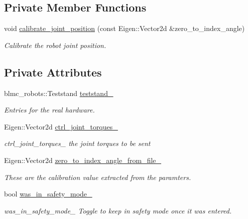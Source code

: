 \subsection*{Private Member Functions}
\begin{DoxyCompactItemize}
\item 
void \hyperlink{classdg__blmc__robots_1_1DGMTeststand_a0bce1340d617bfd6665cebef4d091ab1}{calibrate\+\_\+joint\+\_\+position} (const Eigen\+::\+Vector2d \&zero\+\_\+to\+\_\+index\+\_\+angle)
\begin{DoxyCompactList}\small\item\em Calibrate the robot joint position. \end{DoxyCompactList}\end{DoxyCompactItemize}
\subsection*{Private Attributes}
\begin{DoxyCompactItemize}
\item 
blmc\+\_\+robots\+::\+Teststand \hyperlink{classdg__blmc__robots_1_1DGMTeststand_a682499397e16186076999d8705e12c95}{teststand\+\_\+}
\begin{DoxyCompactList}\small\item\em Entries for the real hardware. \end{DoxyCompactList}\item 
Eigen\+::\+Vector2d \hyperlink{classdg__blmc__robots_1_1DGMTeststand_a7c5db196b671570171458720ea4341a8}{ctrl\+\_\+joint\+\_\+torques\+\_\+}\hypertarget{classdg__blmc__robots_1_1DGMTeststand_a7c5db196b671570171458720ea4341a8}{}\label{classdg__blmc__robots_1_1DGMTeststand_a7c5db196b671570171458720ea4341a8}

\begin{DoxyCompactList}\small\item\em ctrl\+\_\+joint\+\_\+torques\+\_\+ the joint torques to be sent \end{DoxyCompactList}\item 
Eigen\+::\+Vector2d \hyperlink{classdg__blmc__robots_1_1DGMTeststand_a788ef9391e891af10ab9b76f18139e5c}{zero\+\_\+to\+\_\+index\+\_\+angle\+\_\+from\+\_\+file\+\_\+}
\begin{DoxyCompactList}\small\item\em These are the calibration value extracted from the paramters. \end{DoxyCompactList}\item 
bool \hyperlink{classdg__blmc__robots_1_1DGMTeststand_a5821be382bfd2ec8b5bb668b2aacc2ea}{was\+\_\+in\+\_\+safety\+\_\+mode\+\_\+}\hypertarget{classdg__blmc__robots_1_1DGMTeststand_a5821be382bfd2ec8b5bb668b2aacc2ea}{}\label{classdg__blmc__robots_1_1DGMTeststand_a5821be382bfd2ec8b5bb668b2aacc2ea}

\begin{DoxyCompactList}\small\item\em was\+\_\+in\+\_\+safety\+\_\+mode\+\_\+ Toggle to keep in safety mode once it was entered. \end{DoxyCompactList}\end{DoxyCompactItemize}


